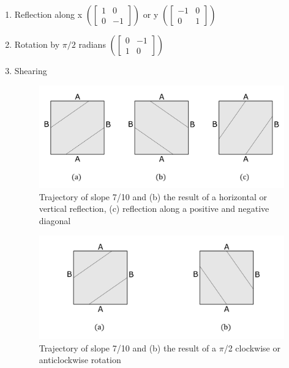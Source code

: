\documentclass{report}
\begin{document}
\begin{enumerate}

\item Reflection along x
$ (\begin{bmatrix}
1&0\\0&-1
\end{bmatrix})$
or y
$ (\begin{bmatrix}
-1&0\\0&1
\end{bmatrix})$

\item Rotation by $\pi/2$ radians
$ (\begin{bmatrix}
0&-1\\1&0
\end{bmatrix})$

\item Shearing

\begin{figure} 
\begin{center}
\includegraphics[scale=0.3]{6}
\caption{Trajectory of slope 7/10 and (b) the result of a horizontal or vertical reflection, (c) reflection along a positive and negative diagonal}
\end{center}
\end{figure}

\begin{figure} 
\begin{center}
\includegraphics[scale=0.3]{7}
\caption{Trajectory of slope 7/10 and (b) the result of a $\pi$/2 clockwise or anticlockwise rotation}
\end{center}
\end{figure}

\end{enumerate}
\end{document}
